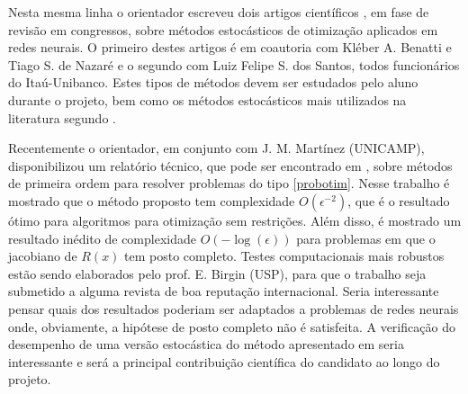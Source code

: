 \documentclass[a4paper,12pt]{article}
\begin{document}
Nesta mesma linha o orientador escreveu dois artigos científicos \cite{TCCLF, TCCKleber}, em fase de revisão em congressos, sobre métodos estocásticos de otimização aplicados em redes neurais. O primeiro destes artigos é em coautoria com Kléber A. Benatti e Tiago S. de Nazaré e o segundo com Luiz Felipe S. dos Santos, todos funcionários do Itaú-Unibanco. Estes tipos de métodos devem ser estudados pelo aluno durante o projeto, bem como os métodos estocásticos mais utilizados na literatura segundo \cite{livroGoodfellow}.


Recentemente o orientador, em conjunto com J. M. Martínez (UNICAMP), disponibilizou um relatório técnico, que pode ser encontrado em \cite{bmLS}, sobre métodos de primeira ordem para resolver problemas do tipo \eqref{probotim}.
Nesse trabalho é mostrado que o método proposto tem complexidade $O(\epsilon^{-2})$, que é o resultado ótimo para algoritmos para otimização sem restrições. Além disso, é mostrado um resultado inédito de complexidade $O(-\log(\epsilon))$ para problemas em que o jacobiano de $R(x)$ tem posto completo. Testes computacionais mais robustos estão sendo elaborados pelo prof. E. Birgin (USP), para que o trabalho seja submetido a alguma revista de boa reputação internacional. Seria interessante pensar quais dos resultados poderiam ser adaptados a problemas de redes neurais onde, obviamente, a hipótese de posto completo não é satisfeita. A verificação do desempenho de uma versão estocástica do método apresentado em \cite{bmLS} seria interessante e será a principal contribuição científica do candidato ao longo do projeto.
\end{document}
